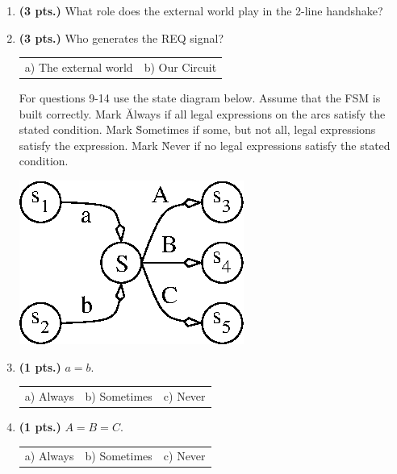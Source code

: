 \documentclass{article}
\begin{document}
\begin{enumerate}
\item {\bf (3 pts.)} What role does the external world play in the 
2-line handshake?

\item {\bf (3 pts.)} Who generates the REQ signal?

\begin{tabular}{p{1.75in}p{1.75in}}
a) The external world & b) Our Circuit \\
\end{tabular}


\pagebreak
For questions 9-14 use the state diagram below.  Assume that the
FSM is built correctly.  Mark {\u Always} if all legal expressions
on the arcs satisfy the stated condition. Mark {\u Sometimes} if some,
but not all, legal expressions satisfy the expression.  Mark
{\u Never} if no legal expressions satisfy the stated condition.

\includegraphics{./Fig3/trans.eps}

\item{\bf (1 pts.)} $a = b$.

\begin{tabular}{p{1.25in}p{1.25in}p{1.25in}}
a) Always  & b) Sometimes & c) Never  \\
\end{tabular}

\item{\bf (1 pts.)} $A = B = C$.

\begin{tabular}{p{1.25in}p{1.25in}p{1.25in}}
a) Always  & b) Sometimes & c) Never  \\
\end{tabular}


\end{enumerate}
\end{document}

